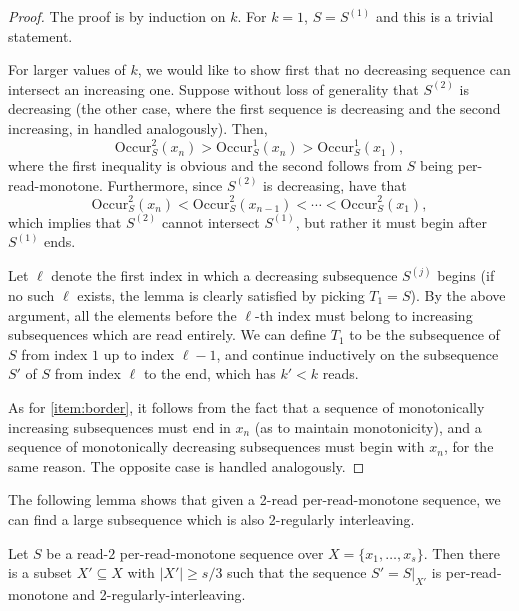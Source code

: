 \documentclass[11pt]{article}
\newcommand{\occur}[3]{\mathrm{Occur}_{#1}^{#2}({#3})}
\begin{document}
\begin{proof}
The proof is by induction on $k$. For $k=1$, $S=S^{(1)}$ and this is a trivial statement.

For larger values of $k$, we would like to show first that no decreasing sequence can intersect an increasing one. Suppose without loss of generality that $S^{(2)}$ is decreasing (the other case, where the first sequence is decreasing and the second increasing, in handled analogously). Then,
\[
\occur{S}{2}{x_n} > \occur{S}{1}{x_n} > \occur{S}{1}{x_1},
\]
where the first inequality is obvious and the second follows from $S$ being per-read-monotone. Furthermore, since $S^{(2)}$ is decreasing, have that 
\[
\occur{S}{2}{x_n} < \occur{S}{2}{x_{n-1}} < \cdots < \occur{S}{2}{x_1},
\]
which implies that $S^{(2)}$ cannot intersect $S^{(1)}$, but rather it must begin after $S^{(1)}$ ends.

Let $\ell$ denote the first index in which a decreasing subsequence $S^{(j)}$ begins (if no such $\ell$ exists, the lemma is clearly satisfied by picking $T_1=S$). By the above argument, all the elements before the $\ell$-th index must belong to increasing subsequences which are read entirely. We can define $T_1$ to be the subsequence of $S$ from index $1$ up to index $\ell - 1$, and continue inductively on the subsequence $S'$ of $S$ from index $\ell$ to the end, which has $k' < k$ reads.

As for \autoref{item:border}, it follows from the fact that a sequence of monotonically increasing subsequences must end in $x_n$ (as to maintain monotonicity), and a sequence of monotonically decreasing subsequences must begin with $x_n$, for the same reason. The opposite case is handled analogously.
\end{proof}


The following lemma shows that given a 2-read per-read-monotone sequence, we can find a large subsequence which is also 2-regularly interleaving.

\begin{lemma}
\label{lem:2-per-read-regular}
Let $S$ be a read-$2$ per-read-monotone sequence over $X=\{x_1, \ldots, x_s\}$. Then there is a subset $X' \subseteq X$ with $|X'| \ge s/3$ such that the sequence $S' = S|_{X'}$ is per-read-monotone and 2-regularly-interleaving. 
\end{lemma}
\end{document}
